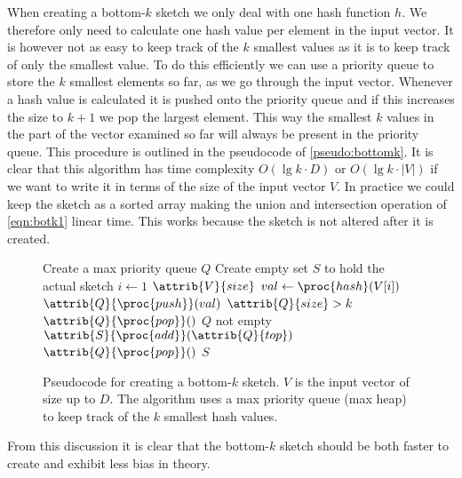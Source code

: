 When creating a bottom-$k$ sketch we only deal with one hash function $h$.
We therefore only need to calculate one hash value per element in the input
vector. It is however not as easy to keep track of the $k$ smallest values
as it is to keep track of only the smallest value. To do this efficiently we
can use a priority queue to store the $k$ smallest elements so far, as we go
through the input vector. Whenever a hash value is calculated it is pushed
onto the priority queue and if this increases the size to $k+1$ we pop the
largest element. This way the smallest $k$ values in the part of the vector
examined so far will always be present in the priority queue. This procedure
is outlined in the pseudocode of \autoref{pseudo:bottomk}. It is clear that
this algorithm has time complexity $O(\lg k\cdot D)$ or $O(\lg k\cdot |V|)$ if
we want to write it in terms of the size of the input vector $V$. In practice
we could keep the sketch as a sorted array making the union and intersection
operation of \autoref{eqn:botk1} linear time. This works because the sketch
is not altered after it is created.

\begin{figure}[htbp]
\begin{codebox}
    \li Create a max priority queue $Q$
    \li Create empty set $S$ to hold the actual sketch
    \li \For $i\gets 1$ \To $\attrib{V}{size}$
    \li \Do
            $val \gets \proc{hash}(V[i])$
    \li     $\attrib{Q}{\proc{push}}(val)$
    \li     \If $\attrib{Q}{size} > k$
    \li     \Then
                $\attrib{Q}{\proc{pop}}()$
            \End
        \End
    \li \While $Q$ not empty
    \li \Do
            $\attrib{S}{\proc{add}}(\attrib{Q}{top})$
    \li     $\attrib{Q}{\proc{pop}}()$
        \End
    \li \Return $S$
\end{codebox}
\caption{Pseudocode for creating a bottom-$k$ sketch. $V$ is the input vector
         of size up to $D$. The algorithm uses a max priority queue (max heap)
         to keep track of the $k$ smallest hash values.}
\label{pseudo:bottomk}
\end{figure}

From this discussion it is clear that the bottom-$k$ sketch should be both
faster to create and exhibit less bias in theory.


